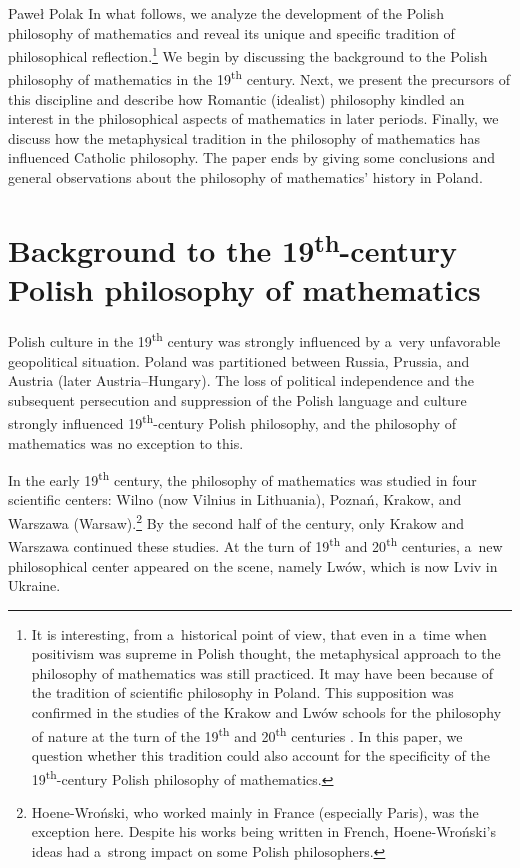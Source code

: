 \begin{artengenv}{Paweł Polak}
In what follows, we analyze the development of the Polish philosophy of mathematics and reveal its unique and specific tradition of philosophical reflection.\footnote{It is interesting, from a~historical point of view, that even in a~time when positivism was supreme in Polish thought, the metaphysical approach to the philosophy of mathematics was still practiced. It may have been because of the tradition of scientific philosophy in Poland. This supposition was confirmed in the studies of the Krakow and Lwów schools for the philosophy of nature at the turn of the 19\textsuperscript{th} and 20\textsuperscript{th} centuries
\parencites[][]{heller_how_2019}[][]{polak_philosophy_2016}[][]{polak_philosophy_2019}[][]{heller_krakowska_2007}. %
 In this paper, we question whether this tradition could also account for the specificity of the 19\textsuperscript{th}-century Polish philosophy of mathematics. } We begin by discussing the background to the Polish philosophy of mathematics in the 19\textsuperscript{th} century. Next, we present the precursors of this discipline and describe how Romantic (idealist) philosophy kindled an interest in the philosophical aspects of mathematics in later periods. Finally, we discuss how the metaphysical tradition in the philosophy of mathematics has influenced Catholic philosophy. The paper ends by giving some conclusions and general observations about the philosophy of mathematics' history in Poland.

\section*{Background to the 19\textsuperscript{th}-century Polish philosophy of mathematics}

Polish culture in the 19\textsuperscript{th} century was strongly influenced by a~very unfavorable geopolitical situation. Poland was partitioned between Russia, Prussia, and Austria (later Austria–Hungary). The loss of political independence and the subsequent persecution and suppression of the Polish language and culture strongly influenced 19\textsuperscript{th}-century Polish philosophy, and the philosophy of mathematics was no exception to this.

In the early 19\textsuperscript{th} century, the philosophy of mathematics was studied in four scientific centers: Wilno (now Vilnius in Lithuania), Poznań, Krakow, and Warszawa (Warsaw).\footnote{Hoene-Wroński, who worked mainly in France (especially Paris), was the exception here. Despite his works being written in French, Hoene-Wroński's ideas had a~strong impact on some Polish philosophers.} By the second half of the century, only Krakow and Warszawa continued these studies. At the turn of 19\textsuperscript{th} and 20\textsuperscript{th} centuries, a~new philosophical center appeared on the scene, namely Lwów, which is now Lviv in Ukraine.


\end{artengenv}
